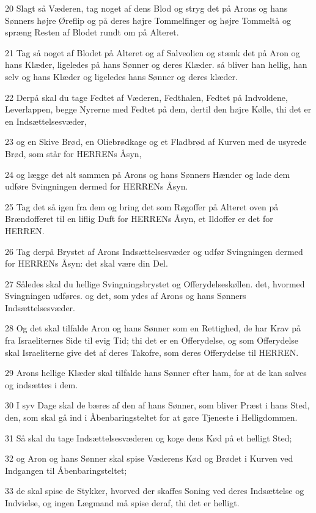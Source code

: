 \par 20 Slagt så Væderen, tag noget af dens Blod og stryg det på Arons og hans Sønners højre Øreflip og på deres højre Tommelfinger og højre Tommeltå og spræng Resten af Blodet rundt om på Alteret.
\par 21 Tag så noget af Blodet på Alteret og af Salveolien og stænk det på Aron og hans Klæder, ligeledes på hans Sønner og deres Klæder. så bliver han hellig, han selv og hans Klæder og ligeledes hans Sønner og deres klæder.
\par 22 Derpå skal du tage Fedtet af Væderen, Fedthalen, Fedtet på Indvoldene, Leverlappen, begge Nyrerne med Fedtet på dem, dertil den højre Kølle, thi det er en Indsættelsesvæder,
\par 23 og en Skive Brød, en Oliebrødkage og et Fladbrød af Kurven med de usyrede Brød, som står for HERRENs Åsyn,
\par 24 og lægge det alt sammen på Arons og hans Sønners Hænder og lade dem udføre Svingningen dermed for HERRENs Åsyn.
\par 25 Tag det så igen fra dem og bring det som Røgoffer på Alteret oven på Brændofferet til en liflig Duft for HERRENs Åsyn, et Ildoffer er det for HERREN.
\par 26 Tag derpå Brystet af Arons Indsættelsesvæder og udfør Svingningen dermed for HERRENs Åsyn: det skal være din Del.
\par 27 Således skal du hellige Svingningsbrystet og Offerydelseskøllen. det, hvormed Svingningen udføres. og det, som ydes af Arons og hans Sønners Indsættelsesvæder.
\par 28 Og det skal tilfalde Aron og hans Sønner som en Rettighed, de har Krav på fra Israeliternes Side til evig Tid; thi det er en Offerydelse, og som Offerydelse skal Israeliterne give det af deres Takofre, som deres Offerydelse til HERREN.
\par 29 Arons hellige Klæder skal tilfalde hans Sønner efter ham, for at de kan salves og indsættes i dem.
\par 30 I syv Dage skal de bæres af den af hans Sønner, som bliver Præst i hans Sted, den, som skal gå ind i Åbenbaringsteltet for at gøre Tjeneste i Helligdommen.
\par 31 Så skal du tage Indsættelsesvæderen og koge dens Kød på et helligt Sted;
\par 32 og Aron og hans Sønner skal spise Væderens Kød og Brødet i Kurven ved Indgangen til Åbenbaringsteltet;
\par 33 de skal spise de Stykker, hvorved der skaffes Soning ved deres Indsættelse og Indvielse, og ingen Lægmand må spise deraf, thi det er helligt.
